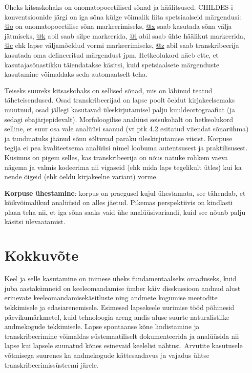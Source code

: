 \documentclass[12pt]{article}
\begin{document}
Üheks kitsaskohaks on onomatopoeetilised sõnad ja häälitsused. CHILDES-i konventsioonide järgi on iga sõna külge võimalik liita spetsiaalseid märgendusi: \underline{@o} on onomatopoeetilise sõna markeerimiseks, \underline{@x} saab kasutada sõna välja jätmiseks, \underline{@k} abil saab silpe markeerida, \underline{@l} abil saab ühte häälikut markeerida, \underline{@c} ehk lapse väljamõeldud vormi markeerimiseks, \underline{@z} abil saab transkribeerija kasutada oma defineeritud märgendust jpm. Hetkeolukord näeb ette, et kasutajasõnastikku täiendatakse käsitsi, kuid spetsiaalsete märgenduste kasutamine võimaldaks seda automaatselt teha.

Teiseks suureks kitsaskohaks on sellised sõnad, mis on läbinud teatud täheteisendused. Osad transkribeerijad on lapse poolt öeldut kirjakeelsemaks muutnud, osad jällegi kasutavad üleskirjutamisel palju kuuldeortograafiat (ja sedagi ebajärjepidevalt). Morfoloogilise analüüsi seisukohalt on hetkeolukord selline, et suur osa vale analüüsi saanud (vt ptk 4.2 esitatud viiendat sõnarühma) ja tundmatuks jäänud sõnu sõltuvad paraku üleskirjutamise viisist. Korpuse tegija ei pea kvaliteetsema analüüsi nimel loobuma autentsusest ja praktilisusest. Küsimus on pigem selles, kas transkribeerija on nõus natuke rohkem vaeva nägema ja valmis kodeerima nii vigaseid (ehk mida laps tegelikult ütles) kui ka nende õigeid (ehk öeldu kirjakeelne variant) vorme.


\textbf{Korpuse ühestamine}: korpus on praegusel kujul ühestamata, see tähendab, et kõikvõimalikud analüüsid on alles jäetud. Pikemas perspektiivis on kindlasti plaan teha nii, et iga sõna saaks vaid ühe analüüsivariandi, kuid see nõuab palju käsitsi ülevaatamist.


\newpage
{}
\section*{Kokkuvõte}


Keel ja selle kasutamine on inimese üheks fundamentaalseks omaduseks, kuid juba aastakümneid on keeleomandamise ümber käiv disskussioon andnud alust erinevate keeleomandamisekäsitluste ning andmete kogumise meetodite tekkimisele ja edasiarenemisele. Esimesed lapsekeele uurimise tööd põhinesid päevikumärkmetel, kuid tehnoloogia areng andis aluse suurte naturalistlike andmekogude tekkimisele. Lapse spontaanse kõne lindistamine ja transkribeerimine võimaldas süstemaatiliselt dokumenteerida ja analüüsida nii lapse kui lapsele suunatud kõnes esinevaid keelelisi nähtusi. Arvutite kasutusele võtmisega suurenes ka andmekogude kättesaadavus ja vajadus ühtse transkribeerimissüsteemi järele.
\end{document}
